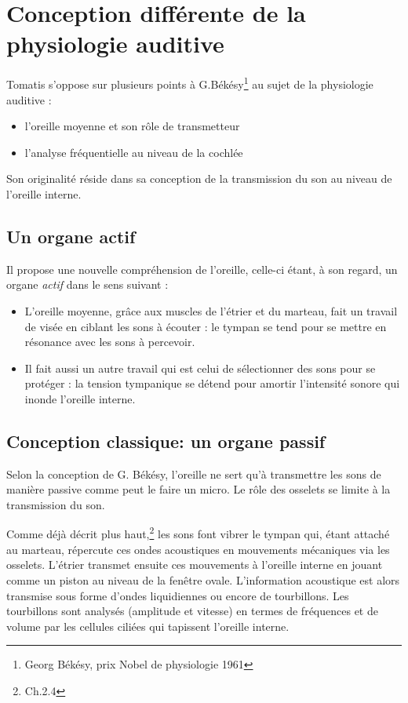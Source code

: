 \section{Conception différente de la physiologie auditive}

Tomatis  s'oppose sur plusieurs points à G.Békésy\footnote{Georg Békésy, prix Nobel de physiologie 1961} au sujet de la
physiologie auditive : 
\begin{itemize}
\item l'oreille moyenne et son rôle de transmetteur 
\item l'analyse fréquentielle au niveau de la cochlée
\end{itemize}

Son originalité réside dans sa conception de la transmission du son
au niveau de l'oreille interne. 

\subsection{Un organe actif}

Il propose une nouvelle compréhension de l'oreille, celle-ci étant,
à son regard, un organe \emph{actif}%
 dans le sens suivant :
\begin{itemize}
\item L'oreille moyenne, grâce aux muscles de l'étrier et du marteau, fait
un travail de visée en ciblant les sons à écouter : le tympan se tend
pour se mettre en résonance avec les sons à percevoir.
\item Il fait aussi un autre travail qui est celui de sélectionner des sons
pour se protéger : la tension tympanique se détend pour amortir l'intensité
sonore qui inonde l'oreille interne. 
\end{itemize}

\subsection{Conception classique: un organe passif}

Selon la conception de G. Békésy,
l'oreille ne sert qu'à transmettre les sons de manière passive
 comme peut le faire un micro. 
 Le rôle des osselets se limite à la transmission du
son. 

Comme déjà décrit plus haut,\footnote{Ch.2.4} les sons font vibrer le tympan qui,
étant attaché au marteau, répercute ces ondes acoustiques en mouvements mécaniques via les osselets. L'étrier transmet ensuite ces mouvements à l'oreille interne en jouant comme un piston au niveau de la fenêtre
ovale. L'information acoustique est alors transmise sous forme d'ondes
liquidiennes ou encore de tourbillons. Les tourbillons sont analysés (amplitude et vitesse) en termes de fréquences et de volume par les
cellules ciliées qui tapissent l'oreille interne.

